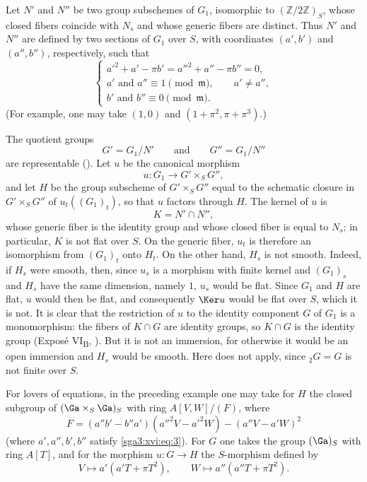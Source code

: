 Let \(N'\) and \(N''\) be two group subschemes of \(G_1\), isomorphic
to \((\mathbb Z/2\mathbb Z)_S\), whose closed fibers coincide with
\(N_s\) and whose generic fibers are distinct. Thus \(N'\) and
\(N''\) are defined by two sections of \(G_1\) over \(S\), with
coordinates \((a',b')\) and \((a'',b'')\), respectively, such that
\begin{equation}
  \begin{cases}
    a'^2+a'-\pi b'=a''^2+a''-\pi b''=0,\\
    a'\text{ and }a''\equiv 1\pmod{\mathfrak m},
      \qquad a'\ne a'',\\
    b'\text{ and }b''\equiv 0\pmod{\mathfrak m}.
  \end{cases}
  \tag{3}\label{sga3:xvi:eq:3}
\end{equation}
(For example, one may take \((1,0)\) and
\((1+\pi^2,\pi+\pi^3)\).)

The quotient groups
\[
  G'=G_1/N'
  \qquad\text{and}\qquad
  G''=G_1/N''
\]
are representable (). Let \(u\) be the canonical
morphism
\[
  u:G_1\longrightarrow G'\times_S G'',
\]
and let \(H\) be the group subscheme of \(G'\times_S G''\) equal to
the schematic closure in \(G'\times_S G''\) of
\(u_t((G_1)_t)\), so that \(u\) factors through \(H\). The kernel of
\(u\) is
\[
  K=N'\cap N'',
\]
whose generic fiber is the identity group and whose closed fiber is
equal to \(N_s\); in particular, \(K\) is not flat over \(S\). On the
generic fiber, \(u_t\) is therefore an isomorphism from
\((G_1)_t\) onto \(H_t\). On the other hand, \(H_s\) is not smooth.
Indeed, if \(H_s\) were smooth, then, since \(u_s\) is a morphism with
finite kernel and \((G_1)_s\) and \(H_s\) have the same dimension,
namely \(1\), \(u_s\) would be flat. Since \(G_1\) and \(H\) are flat,
\(u\) would then be flat, and consequently \(\Ker u\) would be flat
over \(S\), which it is not. It is clear that the restriction of
\(u\) to the identity component \(G\) of \(G_1\) is a monomorphism:
the fibers of \(K\cap G\) are identity groups, so \(K\cap G\) is the
identity group (Exposé VI\textsubscript{B}, ). But it is not an
immersion, for otherwise it would be an open immersion and \(H_s\)
would be smooth. Here  does not apply, since
\({}_{2}G=G\) is not finite over \(S\).

For lovers of equations, in the preceding example one may take for
\(H\) the closed subgroup of \((\Ga\times_S\Ga)_S\) with ring
\(A[V,W]/(F)\), where
\[
  F=(a''b'-b''a')(a''^2V-a'^2W)-(a''V-a'W)^2
\]
(where \(a',a'',b',b''\) satisfy \eqref{sga3:xvi:eq:3}). For \(G\)
one takes the group \((\Ga)_S\) with ring \(A[T]\), and for the
morphism \(u:G\to H\) the \(S\)-morphism defined by
\[
  V\longmapsto a'(a'T+\pi T^2),
  \qquad
  W\longmapsto a''(a''T+\pi T^2).
\]

